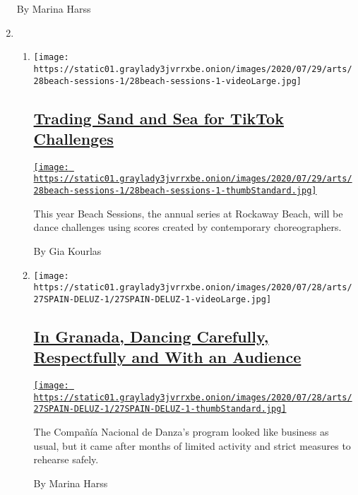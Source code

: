 \begin{enumerate}
  By Marina Harss
\item
  \begin{enumerate}
  \def\labelenumii{\arabic{enumii}.}
  \item
    \texttt{[image: https://static01.graylady3jvrrxbe.onion/images/2020/07/29/arts/28beach-sessions-1/28beach-sessions-1-videoLarge.jpg]}

    \hypertarget{trading-sand-and-sea-for-tiktok-challenges}{%
    \subsection{\texorpdfstring{\href{/2020/07/28/arts/dance/beach-sessions-rockaway-tiktok.html}{Trading
    Sand and Sea for TikTok
    Challenges}}{Trading Sand and Sea for TikTok Challenges}}\label{trading-sand-and-sea-for-tiktok-challenges}}

    \href{/2020/07/28/arts/dance/beach-sessions-rockaway-tiktok.html}{\texttt{[image: https://static01.graylady3jvrrxbe.onion/images/2020/07/29/arts/28beach-sessions-1/28beach-sessions-1-thumbStandard.jpg]}}

    This year Beach Sessions, the annual series at Rockaway Beach, will
    be dance challenges using scores created by contemporary
    choreographers.

    By Gia Kourlas
  \item
    \texttt{[image: https://static01.graylady3jvrrxbe.onion/images/2020/07/28/arts/27SPAIN-DELUZ-1/27SPAIN-DELUZ-1-videoLarge.jpg]}

    \hypertarget{in-granada-dancing-carefully-respectfully-and-with-an-audience}{%
    \subsection{\texorpdfstring{\href{/2020/07/27/arts/dance/granada-festival-compania-nacional-de-danza.html}{In
    Granada, Dancing Carefully, Respectfully and With an
    Audience}}{In Granada, Dancing Carefully, Respectfully and With an Audience}}\label{in-granada-dancing-carefully-respectfully-and-with-an-audience}}

    \href{/2020/07/27/arts/dance/granada-festival-compania-nacional-de-danza.html}{\texttt{[image: https://static01.graylady3jvrrxbe.onion/images/2020/07/28/arts/27SPAIN-DELUZ-1/27SPAIN-DELUZ-1-thumbStandard.jpg]}}

    The Compañía Nacional de Danza's program looked like business as
    usual, but it came after months of limited activity and strict
    measures to rehearse safely.

    By Marina Harss
  \end{enumerate}
\end{enumerate}

